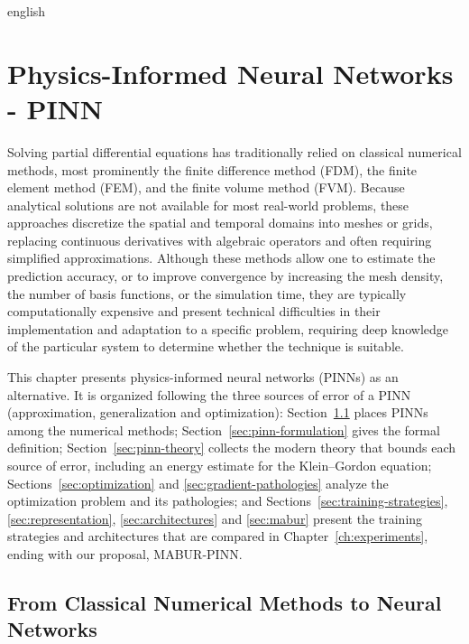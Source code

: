 \documentclass[0000.tex]{subfiles}
\begin{document}

\begin{hyphenrules}{english}

\chapter{Physics-Informed Neural Networks - PINN}\label{ch:pinns}

Solving partial differential equations has traditionally relied on classical numerical methods, most
prominently the finite difference method (FDM), the finite element method (FEM), and the finite volume
method (FVM). Because analytical solutions are not available for most real-world problems, these
approaches discretize the spatial and temporal domains into meshes or grids, replacing continuous
derivatives with algebraic operators and often requiring simplified approximations. Although these
methods allow one to estimate the prediction accuracy, or to improve convergence by increasing the
mesh density, the number of basis functions, or the simulation time, they are typically computationally
expensive and present technical difficulties in their implementation and adaptation to a specific
problem, requiring deep knowledge of the particular system to determine whether the technique is
suitable.

This chapter presents physics-informed neural networks (PINNs) as an alternative. It is organized
following the three sources of error of a PINN (approximation, generalization and optimization):
Section~\ref{sec:pinn-background} places PINNs among the numerical methods; Section~\ref{sec:pinn-formulation}
gives the formal definition; Section~\ref{sec:pinn-theory} collects the modern theory that bounds each source
of error, including an energy estimate for the Klein--Gordon equation; Sections~\ref{sec:optimization} and \ref{sec:gradient-pathologies}
analyze the optimization problem and its pathologies; and
Sections~\ref{sec:training-strategies}, \ref{sec:representation}, \ref{sec:architectures} and \ref{sec:mabur} present the training
strategies and architectures that are compared in Chapter~\ref{ch:experiments}, ending with our proposal,
MABUR-PINN.

\section{From Classical Numerical Methods to Neural Networks}\label{sec:pinn-background}


\end{hyphenrules}
\end{document}

